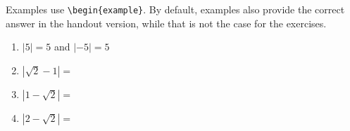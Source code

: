 \documentclass{ximera}
\begin{document}
Examples use \verb|\begin{example}|. 
By default, examples also provide the correct answer in the handout version, while that is not the case for the exercises.

\renewcommand{\choiceminimumverticalsize}{\vphantom{$\sqrt{2}$}} 

\begin{example} \nl 

\begin{xmmulticols}
		\begin{enumerate}
			\item $|5|=5$ and $|-5|=5$
			\item $|\sqrt{2}-1| = $
			\item $|1-\sqrt{2}| = $
			\item $|2-\sqrt{2}| = $
		\end{enumerate}
\end{xmmulticols}
\end{example}
\end{document}
